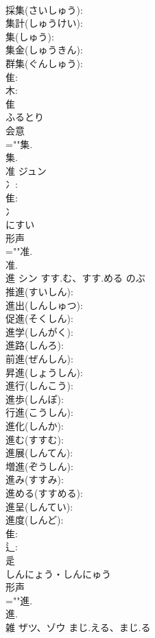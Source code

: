 \documentclass[8pt]{extreport}
\begin{document}
\begin{CJK}{UTF8}{min}
\\	採集(さいしゅう): 
\\	集計(しゅうけい): 
\\	集(しゅう): 
\\	集金(しゅうきん): 
\\	群集(ぐんしゅう): 
\\	隹: 
\\	木: 
\\	隹	
\\	ふるとり	
\\	会意 
\\	=""集.
\\	集.
\\	准	ジュン			
\\	冫: 
\\	隹: 
\\	冫	
\\	にすい	
\\	形声 
\\	=""准.
\\	准.
\\	進	シン	すす.む、すす.める	のぶ	
\\	推進(すいしん): 
\\	進出(しんしゅつ): 
\\	促進(そくしん): 
\\	進学(しんがく): 
\\	進路(しんろ): 
\\	前進(ぜんしん): 
\\	昇進(しょうしん): 
\\	進行(しんこう): 
\\	進歩(しんぽ): 
\\	行進(こうしん): 
\\	進化(しんか): 
\\	進む(すすむ): 
\\	進展(しんてん): 
\\	増進(ぞうしん): 
\\	進み(すすみ): 
\\	進める(すすめる): 
\\	進呈(しんてい): 
\\	進度(しんど): 
\\	隹: 
\\	辶: 
\\	辵	
\\	しんにょう・しんにゅう	
\\	形声 
\\	=""進.
\\	進.
\\	雑	ザツ、ゾウ	まじ.える、まじ.る		

\end{CJK}
\end{document}
